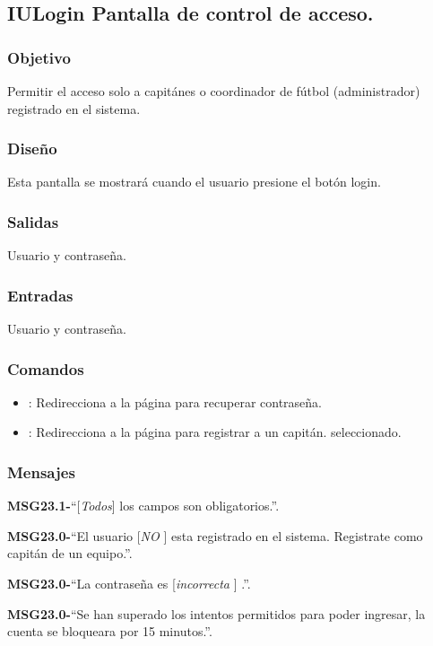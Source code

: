 
\subsection{IULogin Pantalla de control de acceso.}

\subsubsection{Objetivo}
	Permitir el acceso solo a capitánes o coordinador de fútbol (administrador) registrado en el sistema.

\subsubsection{Diseño}
	Esta pantalla se mostrará cuando el usuario presione el botón login.


\subsubsection{Salidas}

	Usuario y contraseña.

\subsubsection{Entradas}
	Usuario y contraseña.

\subsubsection{Comandos}
\begin{itemize}
	\item {}: Redirecciona a la página para recuperar contraseña.
	\item {}: Redirecciona a la página para registrar a un capitán. seleccionado.
\end{itemize}

\subsubsection{Mensajes}
	\begin{Citemize}
		\item {\bf MSG23.1-}``[{\em Todos}] los campos son obligatorios.''.
		\item {\bf MSG23.0-}``El usuario [{\em NO }] esta registrado en el sistema. Registrate como capitán de un equipo.''.
		\item {\bf MSG23.0-}``La contraseña es [{\em incorrecta }] .''.
		\item {\bf MSG23.0-}``Se han superado los intentos permitidos para poder ingresar, la cuenta se bloqueara por 15 minutos.''.
	\end{Citemize}
	
